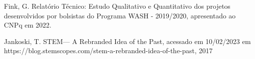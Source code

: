 \documentclass[
12pt,		%
openright,	%
twoside,  %
a4paper,			%
chapter=TITLE,		%
english,			%
french,				%
spanish,			%
brazil				%
]{USPSC-classe/USPSC}
\begin{document}
\begin{flushleft}
\begin{flushleft}
\begin{flushleft}
\begin{flushleft}
\begin{flushleft}
\begin{flushleft}
\begin{flushleft}
\begin{flushleft}
[FINK, 2022] Fink, G. Relat\'orio T\'ecnico: Estudo Qualitativo e Quantitativo dos projetos desenvolvidos por bolsistas do Programa WASH - 2019/2020, apresentado ao CNPq em 2022.
\end{flushleft}


\end{flushleft}


\end{flushleft}


\end{flushleft}


\end{flushleft}


\end{flushleft}


\end{flushleft}


\end{flushleft}


\begin{flushleft}
\begin{flushleft}
\begin{flushleft}
\begin{flushleft}
\begin{flushleft}
\begin{flushleft}
\begin{flushleft}
\begin{flushleft}
[JANKOSKI, 2017] Jankoski, T. STEM— A Rebranded Idea of the Past, acessado em 10/02/2023 em https://blog.stemscopes.com/stem-a-rebranded-idea-of-the-past, 2017
\end{flushleft}


\end{flushleft}


\end{flushleft}


\end{flushleft}


\end{flushleft}


\end{flushleft}


\end{flushleft}


\end{flushleft}
\end{document}
